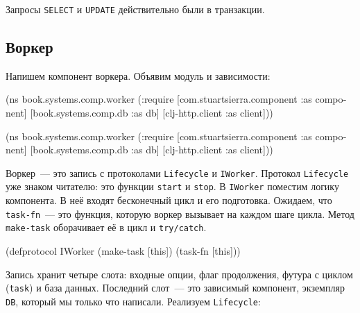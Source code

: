 \fi

\noindent
Запросы \verb|SELECT| и \verb|UPDATE| действительно были в транзакции.

\subsection{Воркер}

Напишем компонент воркера. Объявим модуль и зависимости:

\ifx\DEVICETYPE\MOBILE

\begin{english}
  \begin{clojure}
(ns book.systems.comp.worker
  (:require
   [com.stuartsierra.component
    :as component]
   [book.systems.comp.db :as db]
   [clj-http.client :as client]))
  \end{clojure}
\end{english}

\else

\begin{english}
  \begin{clojure}
(ns book.systems.comp.worker
  (:require
   [com.stuartsierra.component :as component]
   [book.systems.comp.db :as db]
   [clj-http.client :as client]))
  \end{clojure}
\end{english}

\fi


\mnoindent
Воркер~--- это запись с протоколами \verb|Lifecycle| и \verb|IWorker|. Протокол
\verb|Lifecycle| уже знаком читателю: это функции \verb|start| и
\verb|stop|. В \verb|IWorker| поместим логику компонента. В неё входят
бесконечный цикл и его подготовка. Ожидаем, что \verb|task-fn|~--- это функция,
которую воркер вызывает на каждом шаге цикла. Метод \verb|make-task|
оборачивает её в цикл и \verb|try/catch|.

\begin{english}
  \begin{clojure}
(defprotocol IWorker
  (make-task [this])
  (task-fn [this]))
  \end{clojure}
\end{english}

Запись хранит четыре слота: входные опции, флаг продолжения, футура с циклом
(\verb|task|) и база данных. Последний слот~--- это зависимый компонент, экземпляр
\verb|DB|, который мы только что написали. Реализуем \verb|Lifecycle|:

